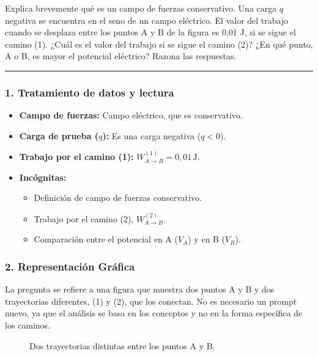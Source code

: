 \begin{cajaenunciado}
Explica brevemente qué es un campo de fuerzas conservativo. Una carga $q$ negativa se encuentra en el seno de un campo eléctrico. El valor del trabajo cuando se desplaza entre los puntos A y B de la figura es 0,01 J, si se sigue el camino (1). ¿Cuál es el valor del trabajo si se sigue el camino (2)? ¿En qué punto, A o B, es mayor el potencial eléctrico? Razona las respuestas.
\end{cajaenunciado}
\hrule

\subsubsection*{1. Tratamiento de datos y lectura}
\begin{itemize}
    \item \textbf{Campo de fuerzas:} Campo eléctrico, que es conservativo.
    \item \textbf{Carga de prueba ($q$):} Es una carga negativa ($q < 0$).
    \item \textbf{Trabajo por el camino (1):} $W_{A \to B}^{(1)} = 0,01 \, \text{J}$.
    \item \textbf{Incógnitas:}
    \begin{itemize}
        \item Definición de campo de fuerzas conservativo.
        \item Trabajo por el camino (2), $W_{A \to B}^{(2)}$.
        \item Comparación entre el potencial en A ($V_A$) y en B ($V_B$).
    \end{itemize}
\end{itemize}

\subsubsection*{2. Representación Gráfica}
La pregunta se refiere a una figura que muestra dos puntos A y B y dos trayectorias diferentes, (1) y (2), que los conectan. No es necesario un prompt nuevo, ya que el análisis se basa en los conceptos y no en la forma específica de los caminos.
\begin{figure}[H]
    \centering
    \caption{Dos trayectorias distintas entre los puntos A y B.}
\end{figure}

